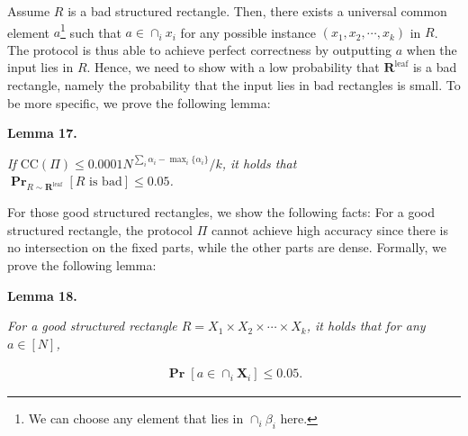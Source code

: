 \documentclass[10pt,a4paper]{article}
\begin{document}
Assume $R$ is a bad structured rectangle. Then, there exists a universal common element $a$\footnote{We can choose any element that lies in $\cap_{i}\beta_{i}$ here.} such that $a\in\cap_{i}x_{i}$ for any possible instance $(x_{1},x_{2},\cdots,x_{k})$ in $R$. The protocol is thus able to achieve perfect correctness by outputting $a$ when the input lies in $R$. Hence, we need to show with a low probability that $\bm{R}^{\text{leaf}}$ is a bad rectangle, namely the probability that the input lies in bad rectangles is small. To be more specific, we prove the following lemma:\par





\par\medskip\noindent\textbf{
\textbf{Lemma 17}\textbf{.}
}\par



\emph{If $\text{CC}(\Pi)\leq 0.0001N^{\sum_{i}{\alpha_{i}}-\mathop{\max}_{i}\{\alpha_{i}\}}/k$, it holds that
$\operatorname*{\mathbf{Pr}}_{R\sim\bm{R}^{\text{leaf}}}[R\text{ is bad}]\leq 0.05$.}\par






For those good structured rectangles, we show the following facts:
For a good structured rectangle, the protocol $\Pi$ cannot achieve high accuracy since there is no intersection on the fixed parts, while the other parts are dense.
Formally, we prove the following lemma:\par





\par\medskip\noindent\textbf{
\textbf{Lemma 18}\textbf{.}
}\par



\emph{For a good structured rectangle $R=X_{1}\times X_{2}\times\cdots\times X_{k}$,
it holds that for any $a\in[N]$,}\par


\[\begin{gathered}
\operatorname*{\mathbf{Pr}}[a\in\cap_{i}\bm{X}_{i}]\leq 0.05.
\end{gathered}\]



\end{document}
